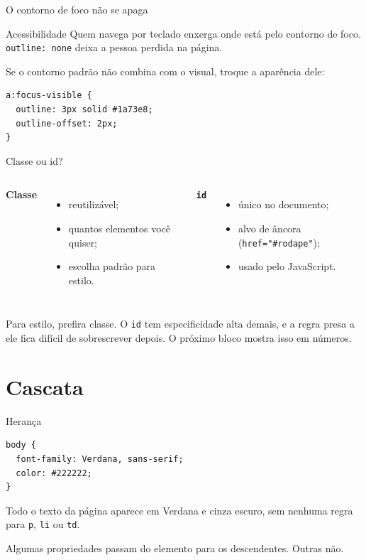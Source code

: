 \documentclass{beamer}
\begin{document}
\begin{frame}[fragile]{O contorno de foco não se apaga}
	\begin{alertblock}{Acessibilidade}
		Quem navega por teclado enxerga onde está pelo contorno de foco.
		\texttt{outline: none} deixa a pessoa perdida na página.
	\end{alertblock}

	\vspace{0.4cm}
	Se o contorno padrão não combina com o visual, troque a aparência dele:

	\begin{verbatim}
a:focus-visible {
  outline: 3px solid #1a73e8;
  outline-offset: 2px;
}
  \end{verbatim}
\end{frame}

\begin{frame}{Classe ou id?}
	\begin{columns}[T]
		\textbf{Classe}
		\begin{itemize}
			\item reutilizável;
			\item quantos elementos você quiser;
			\item escolha padrão para estilo.
		\end{itemize}

		\textbf{\texttt{id}}
		\begin{itemize}
			\item único no documento;
			\item alvo de âncora (\texttt{href="\#rodape"});
			\item usado pelo JavaScript.
		\end{itemize}
	\end{columns}

	\vspace{0.6cm}
	Para estilo, prefira classe. O \texttt{id} tem especificidade alta demais, e a
	regra presa a ele fica difícil de sobrescrever depois. O próximo bloco mostra
	isso em números.
\end{frame}

\section{Cascata}

\begin{frame}[fragile]{Herança}
	\begin{verbatim}
body {
  font-family: Verdana, sans-serif;
  color: #222222;
}
  \end{verbatim}

	\vspace{0.3cm}
	Todo o texto da página aparece em Verdana e cinza escuro, sem nenhuma regra
	para \texttt{p}, \texttt{li} ou \texttt{td}.

	\vspace{0.3cm}
	Algumas propriedades passam do elemento para os descendentes. Outras não.
\end{frame}
\end{document}

